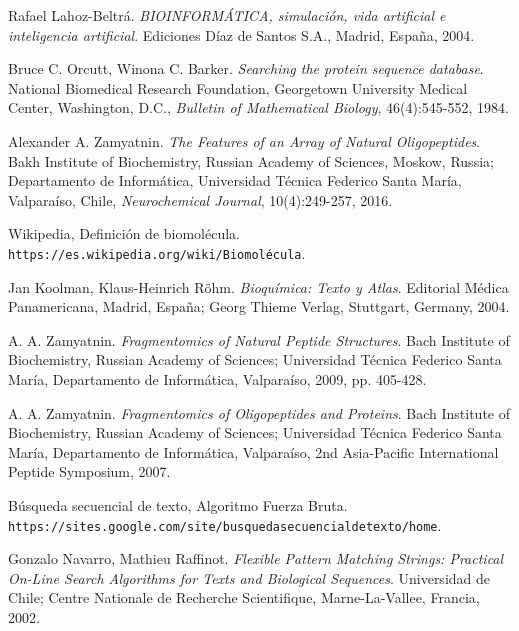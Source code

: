 \documentclass[letterpaper, 12pt, notitlepage]{report}
\begin{document}
\begin{thebibliography}{9}

Rafael Lahoz-Beltrá.
\textit{BIOINFORMÁTICA, simulación, vida artificial e inteligencia artificial}. 
Ediciones Díaz de Santos S.A., Madrid, España, 2004.

Bruce C. Orcutt, Winona C. Barker.
\textit{Searching the protein sequence database}.
National Biomedical Research Foundation, Georgetown University Medical Center,
Washington, D.C., \textit{Bulletin of Mathematical Biology}, 46(4):545-552, 1984.

Alexander A. Zamyatnin.
\textit{The Features of an Array of Natural Oligopeptides}.
Bakh Institute of Biochemistry, Russian Academy of Sciences, Moskow, Russia;
Departamento de Informática, Universidad Técnica Federico Santa María, Valparaíso, Chile,
\textit{Neurochemical Journal}, 10(4):249-257, 2016.

Wikipedia, Definición de biomolécula.
\\\texttt{https://es.wikipedia.org/wiki/Biomolécula}.

Jan Koolman, Klaus-Heinrich Röhm.
\textit{Bioquímica: Texto y Atlas}.
Editorial Médica Panamericana, Madrid, España;
Georg Thieme Verlag, Stuttgart, Germany, 2004.

A. A. Zamyatnin.
\textit{Fragmentomics of Natural Peptide Structures}. 
Bach Institute of Biochemistry, Russian Academy of Sciences;  Universidad Técnica Federico Santa María, Departamento de Informática, Valparaíso, 2009, pp. 405-428.

A. A. Zamyatnin. 
\textit{Fragmentomics of Oligopeptides and Proteins}. 
Bach Institute of Biochemistry, Russian Academy of Sciences;  Universidad Técnica Federico Santa María, Departamento de Informática, Valparaíso, 2nd Asia-Pacific International Peptide Symposium, 2007.

Búsqueda secuencial de texto, Algoritmo Fuerza Bruta.
\\\texttt{https://sites.google.com/site/busquedasecuencialdetexto/home}.

Gonzalo Navarro, Mathieu Raffinot.
\textit{Flexible Pattern Matching Strings: Practical On-Line Search Algorithms for Texts and Biological Sequences}.
Universidad de Chile; Centre Nationale de Recherche Scientifique, Marne-La-Vallee, Francia, 2002.


\end{thebibliography}
\end{document}
